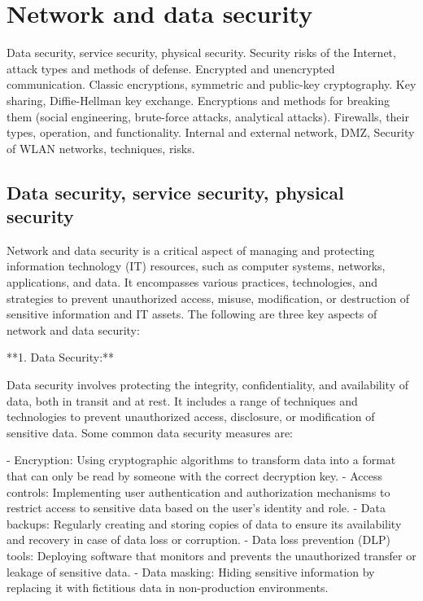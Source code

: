 \documentclass{article}
\begin{document}
\section{Network and data security}

Data security, service security, physical security. Security risks of the Internet, attack types and methods of defense. Encrypted and unencrypted communication. Classic encryptions, symmetric and public-key cryptography. Key sharing, Diffie-Hellman key exchange. Encryptions and methods for breaking them (social engineering, brute-force attacks, analytical attacks). Firewalls, their types, operation, and functionality. Internal and external network, DMZ, Security of WLAN networks, techniques, risks.


\subsection{Data security, service security, physical security}

Network and data security is a critical aspect of managing and protecting information technology (IT) resources, such as computer systems, networks, applications, and data. It encompasses various practices, technologies, and strategies to prevent unauthorized access, misuse, modification, or destruction of sensitive information and IT assets. The following are three key aspects of network and data security:

**1. Data Security:**

Data security involves protecting the integrity, confidentiality, and availability of data, both in transit and at rest. It includes a range of techniques and technologies to prevent unauthorized access, disclosure, or modification of sensitive data. Some common data security measures are:

- Encryption: Using cryptographic algorithms to transform data into a format that can only be read by someone with the correct decryption key.
- Access controls: Implementing user authentication and authorization mechanisms to restrict access to sensitive data based on the user's identity and role.
- Data backups: Regularly creating and storing copies of data to ensure its availability and recovery in case of data loss or corruption.
- Data loss prevention (DLP) tools: Deploying software that monitors and prevents the unauthorized transfer or leakage of sensitive data.
- Data masking: Hiding sensitive information by replacing it with fictitious data in non-production environments.
\end{document}
